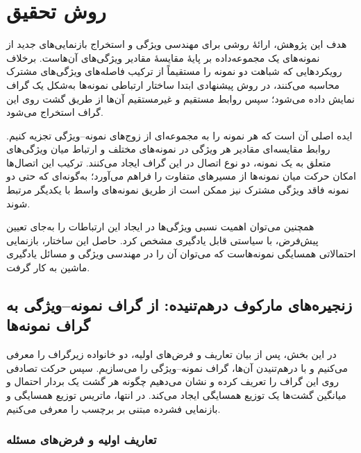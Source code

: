 \chapter{روش تحقیق}
\label{ch:method}
\begingroup
\renewcommand{\theequation}{\thechapter-\arabic{equation}}
\renewcommand{\thedefinition}{\thechapter-\arabic{definition}}

هدف این پژوهش، ارائهٔ روشی برای مهندسی ویژگی و استخراج بازنمایی‌های جدید از نمونه‌های یک مجموعه‌داده بر پایهٔ مقایسهٔ مقادیر ویژگی‌های آن‌هاست. برخلاف رویکردهایی که شباهت دو نمونه را مستقیماً از ترکیب فاصله‌های ویژگی‌های مشترک محاسبه می‌کنند، در روش پیشنهادی ابتدا ساختار ارتباطی نمونه‌ها به‌شکل یک گراف نمایش داده می‌شود؛ سپس روابط مستقیم و غیرمستقیم آن‌ها از طریق گشت روی این گراف استخراج می‌شود.

ایده اصلی آن است که هر نمونه را به مجموعه‌ای از زوج‌های نمونه--ویژگی تجزیه کنیم. روابط مقایسه‌ای مقادیر هر ویژگی در نمونه‌های مختلف و ارتباط میان ویژگی‌های متعلق به یک نمونه، دو نوع اتصال در این گراف ایجاد می‌کنند. ترکیب این اتصال‌ها امکان حرکت میان نمونه‌ها از مسیرهای متفاوت را فراهم می‌آورد؛ به‌گونه‌ای که حتی دو نمونه فاقد ویژگی مشترک نیز ممکن است از طریق نمونه‌های واسط با یکدیگر مرتبط شوند.

همچنین می‌توان اهمیت نسبی ویژگی‌ها در ایجاد این ارتباطات را به‌جای تعیین پیش‌فرض، با سیاستی قابل یادگیری مشخص کرد. حاصل این ساختار، بازنمایی احتمالاتی همسایگی نمونه‌هاست که می‌توان آن را در مهندسی ویژگی و مسائل یادگیری ماشین به کار گرفت.

\section{زنجیره‌های مارکوف درهم‌تنیده: از گراف نمونه--ویژگی به گراف نمونه‌ها}
\label{sec:ch3-interwoven}
در این بخش، پس از بیان تعاریف و فرض‌های اولیه، دو خانواده زیرگراف را معرفی می‌کنیم و با درهم‌تنیدن آن‌ها، گراف نمونه--ویژگی را می‌سازیم. سپس حرکت تصادفی روی این گراف را تعریف کرده و نشان می‌دهیم چگونه هر گشت یک بردار احتمال و میانگین گشت‌ها یک توزیع همسایگی ایجاد می‌کند. در انتها، ماتریس توزیع همسایگی و بازنمایی فشرده مبتنی بر برچسب را معرفی می‌کنیم.

\subsection{تعاریف اولیه و فرض‌های مسئله}
\label{subsec:ch3-definitions}

